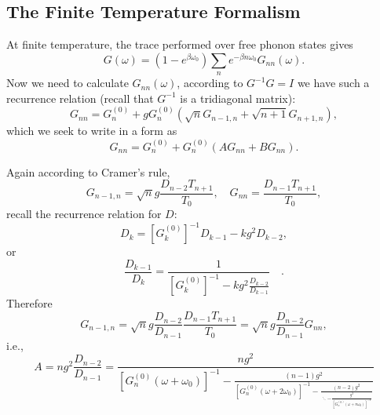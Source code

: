 \documentclass{book}
\numberwithin{equation}{section}
\begin{document}
\subsection{The Finite Temperature Formalism}
At finite temperature, the trace performed over free phonon states gives
\begin{equation}
  G(\omega)=(1-e^{\beta\omega_0})\sum_ne^{-\beta n\omega_0}G_{nn}(\omega).
\end{equation}
Now we need to calculate $G_{nn}(\omega)$, according to $G^{-1}G=I$ we
have such a recurrence relation (recall that $G^{-1}$ is a tridiagonal
matrix):
\begin{equation}
  G_{nn}=G^{(0)}_n+gG^{(0)}_n(\sqrt{n}G_{n-1,n}+\sqrt{n+1}G_{n+1,n}),
\end{equation}
which we seek to write in a form as
\begin{equation}
    G_{nn}=G^{(0)}_n+G^{(0)}_n(AG_{nn}+BG_{nn}).
\end{equation}

Again according to Cramer's rule, 
\begin{equation}
  G_{n-1,n}=\sqrt{n}g\frac{D_{n-2}T_{n+1}}{T_0},\quad
  G_{nn}=\frac{D_{n-1}T_{n+1}}{T_0},
\end{equation}
recall the recurrence relation for $D$:
\begin{equation}
  D_k=[G^{(0)}_k]^{-1}D_{k-1}-kg^2D_{k-2},
\end{equation}
or
\begin{equation}
  \frac{D_{k-1}}{D_k}=\frac{1}{\displaystyle[G^{(0)}_k]^{-1}-kg^2
    \frac{D_{k-2}}{D_{k-1}}}\quad.
\end{equation}
Therefore 
\begin{equation}
  G_{n-1,n}=\sqrt{n}g\frac{D_{n-2}}{D_{n-1}}\frac{D_{n-1}T_{n+1}}{T_0}=
  \sqrt{n}g\frac{D_{n-2}}{D_{n-1}}G_{nn},
\end{equation}
i.e.,
\begin{equation}
  A=ng^2\frac{D_{n-2}}{D_{n-1}}=
  \frac{ng^2}{\displaystyle
    [G^{(0)}_n(\omega+\omega_0)]^{-1}-\frac{(n-1)g^2}{\displaystyle
      [G^{(0)}_n(\omega+2\omega_0)]^{-1}-\frac{(n-2)g^2}{\displaystyle
        \ddots-\frac{g^2}{[G^{(0)}_n(\omega+n\omega_0)]^{-1}}}}}
\end{equation}
\end{document}
